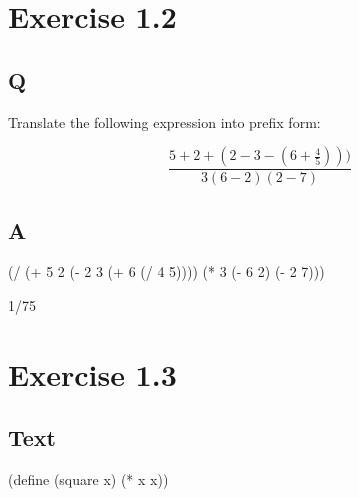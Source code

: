\documentclass[
]{article}
\newenvironment{Shaded}{}{}
\newcommand{\DecValTok}[1]{\textcolor[rgb]{0.25,0.63,0.44}{#1}}
\newcommand{\ExtensionTok}[1]{#1}
\newcommand{\FunctionTok}[1]{\textcolor[rgb]{0.02,0.16,0.49}{#1}}
\newcommand{\NormalTok}[1]{#1}
\newcommand{\OperatorTok}[1]{\textcolor[rgb]{0.40,0.40,0.40}{#1}}
\begin{document}
\hypertarget{exercise-1.2}{%
\section{Exercise 1.2}\label{exercise-1.2}}

\hypertarget{q-1}{%
\subsection{Q}\label{q-1}}

Translate the following expression into prefix form:

\begin{equation}
  \frac{5 + 2 + (2 - 3 - (6 + \frac{4}{5})))}
            {3(6 - 2)(2 - 7)}
\end{equation}

\hypertarget{a-1}{%
\subsection{A}\label{a-1}}

\hypertarget{EX1-2}{%
\label{EX1-2}}%
\begin{Shaded}
\begin{Highlighting}[]
\NormalTok{(}\OperatorTok{/}\NormalTok{ (}\OperatorTok{+} \DecValTok{5} \DecValTok{2}\NormalTok{ (}\OperatorTok{{-}} \DecValTok{2} \DecValTok{3}\NormalTok{ (}\OperatorTok{+} \DecValTok{6}\NormalTok{ (}\OperatorTok{/} \DecValTok{4} \DecValTok{5}\NormalTok{))))}
\NormalTok{   (}\OperatorTok{*} \DecValTok{3}\NormalTok{ (}\OperatorTok{{-}} \DecValTok{6} \DecValTok{2}\NormalTok{) (}\OperatorTok{{-}} \DecValTok{2} \DecValTok{7}\NormalTok{)))}
\end{Highlighting}
\end{Shaded}

1/75

\hypertarget{exercise-1.3}{%
\section{Exercise 1.3}\label{exercise-1.3}}

\hypertarget{text}{%
\subsection{Text}\label{text}}

\hypertarget{square}{%
\label{square}}%
\begin{Shaded}
\begin{Highlighting}[]
\NormalTok{(}\ExtensionTok{define}\FunctionTok{ }\NormalTok{(square x)}
\NormalTok{  (}\OperatorTok{*}\NormalTok{ x x))}
\end{Highlighting}
\end{Shaded}
\end{document}
